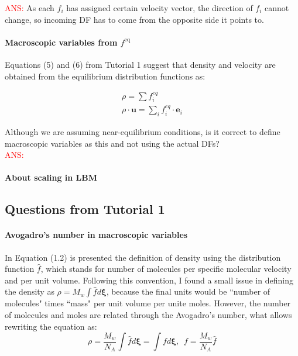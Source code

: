 \documentclass{article}
\begin{document}
	\textcolor{red}{ANS:} As each $f_i$ has assigned certain velocity vector, the direction of $f_i$ cannot change, so incoming DF has to come from the opposite side it points to. 
	
	\paragraph{Macroscopic variables from $f^{\text{eq}}$}
	Equations (5) and (6) from Tutorial 1 suggest that density and velocity are obtained from the equilibrium distribution functions as:

	\begin{eqnarray}
		\rho = \sum f^{eq}_i  \\
		\rho \cdot \mathbf{u} = \sum_i f^{eq}_i \cdot  \mathbf{e}_i
	\end{eqnarray}
	
	Although we are assuming near-equilibrium conditions, is it correct to define macroscopic variables as this and not using the actual DFs?\\
	
	\textcolor{red}{ANS:}
	
	\paragraph{About scaling in LBM}
	
	
	\subsection{Questions from Tutorial 1}
	
	\paragraph{Avogadro's number in macroscopic variables} In Equation (1.2) is presented the definition of density using the distribution function $\hat{f}$, which stands for number of molecules per specific molecular velocity and per unit volume. Following this convention, I found a small issue in defining the density as $\rho = M_{w} \int \hat{f} d\pmb{\xi}$, because the final units would be ``number of molecules" times ``mass" per unit volume per unite moles. However, the number of molecules and moles are related through the Avogadro's number, what allows rewriting the equation as:
	\begin{equation}
		\rho = \frac{M_w}{N_A} \int \hat{f} d\pmb{\xi} = \int f d\pmb{\xi}, \, \, \, f=\frac{M_w}{N_A}\hat{f}
	\end{equation}
\end{document}

